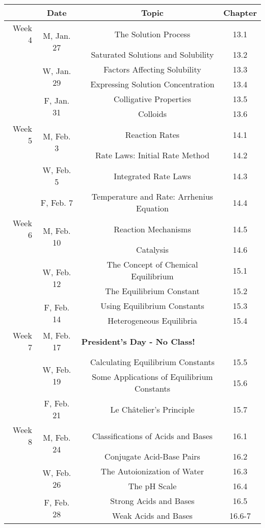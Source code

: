 \documentclass[12pt, letterpaper]{article}
\begin{document}
\begin{tabular}{rcccc}
& Date && Topic & Chapter\\
\midrule
Week 4 & \multirow{2}{*}{M, Jan. 27}& & The Solution Process & 13.1\\
& & & Saturated Solutions and Solubility & 13.2\\
& \multirow{2}{*}{W, Jan. 29}& & Factors Affecting Solubility & 13.3\\
& & & Expressing Solution Concentration & 13.4\\
& \multirow{2}{*}{F, Jan. 31}& & Colligative Properties & 13.5\\
& & & Colloids & 13.6\\
\midrule
Week 5 & \multirow{2}{*}{M, Feb. 3}& & Reaction Rates & 14.1\\
& & & Rate Laws: Initial Rate Method & 14.2\\
& W, Feb. 5&& Integrated Rate Laws & 14.3\\
& F, Feb. 7&& Temperature and Rate: Arrhenius Equation & 14.4\\
\midrule
Week 6 & \multirow{2}{*}{M, Feb. 10}& & Reaction Mechanisms & 14.5\\
& & & Catalysis & 14.6\\
& \multirow{2}{*}{W, Feb. 12}& & The Concept of Chemical Equilibrium & 15.1\\
& & & The Equilibrium Constant & 15.2\\
& \multirow{2}{*}{F, Feb. 14}& & Using Equilibrium Constants & 15.3\\
& & & Heterogeneous Equilibria & 15.4\\
\midrule
Week 7 & M, Feb. 17& \multicolumn{3}{l}{\textbf{President's Day - No Class!}}\\
& \multirow{2}{*}{W, Feb. 19}& & Calculating Equilibrium Constants & 15.5\\
& & & Some Applications of Equilibrium Constants & 15.6\\
& F, Feb. 21&& Le Ch\^atelier's Principle & 15.7\\
\midrule
Week 8 & \multirow{2}{*}{M, Feb. 24}& & Classifications of Acids and Bases & 16.1\\
& & & Conjugate Acid-Base Pairs & 16.2\\
& \multirow{2}{*}{W, Feb. 26}& & The Autoionization of Water & 16.3\\
& & & The pH Scale & 16.4\\
& \multirow{2}{*}{F, Feb. 28}& & Strong Acids and Bases & 16.5\\
& & & Weak Acids and Bases & 16.6-7\\
\end{tabular}
\end{document}
